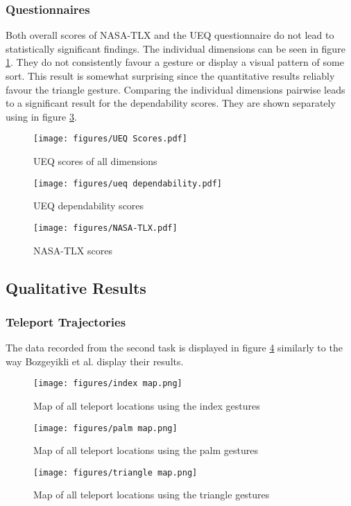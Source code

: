 \subsubsection{Questionnaires}
Both overall scores of NASA-TLX and the UEQ questionnaire do not lead to statistically significant findings. The individual dimensions can be seen in figure \ref{fig:ueqDimensions}. They do not consistently favour a gesture or display a visual pattern of some sort. This result is somewhat surprising since the quantitative results reliably favour the triangle gesture. Comparing the individual dimensions pairwise leads to a significant result for the dependability scores. They are shown separately using in figure \ref{fig:ueqDependability}. 

\begin{figure}[!ht]
    \centering
    \texttt{[image: figures/UEQ Scores.pdf]}
    \caption{UEQ scores of all dimensions}
    \label{fig:ueqDimensions}
\end{figure}

\begin{figure}[!ht]
    \centering
    \texttt{[image: figures/ueq dependability.pdf]}
    \caption{UEQ dependability scores}
    \label{fig:ueqDependability}
\end{figure}

\begin{figure}[!ht]
    \centering
    \texttt{[image: figures/NASA-TLX.pdf]}
    \caption{NASA-TLX scores}
    \label{fig:ueqDependability}
\end{figure}


\subsection{Qualitative Results}

\subsubsection{Teleport Trajectories}
The data recorded from the second task is displayed in figure \ref{fig:exp2maps} similarly to the way Bozgeyikli et al. %
display their results. 

\begin{figure}[!htb]
        \texttt{[image: figures/index map.png]}
        \caption{Map of all teleport locations using the index gestures}\label{fig:map_index}
    \endminipage\hfill
        \texttt{[image: figures/palm map.png]}
        \caption{Map of all teleport locations using the palm gestures}\label{fig:map_palm}
    \endminipage\hfill
        \texttt{[image: figures/triangle map.png]}
        \caption{Map of all teleport locations using the triangle gestures}\label{fig:map_triangle}
        \label{fig:exp2maps}
    \endminipage
\end{figure}
    
